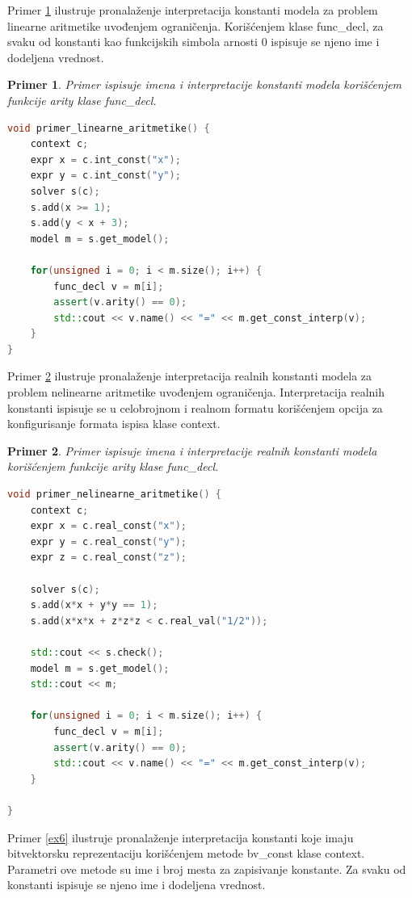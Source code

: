 \documentclass[12pt,oneside]{memoir}
\newtheorem{primer}{Primer}
\begin{document}
Primer \ref{ex4} ilustruje pronalaženje interpretacija konstanti modela za problem linearne aritmetike uvođenjem ograničenja. Korišćenjem klase func\_decl, za svaku od konstanti kao funkcijskih simbola arnosti 0 ispisuje se njeno ime i dodeljena vrednost. 
\begin{primer} \label{ex4}
Primer ispisuje imena i interpretacije konstanti modela korišćenjem funkcije arity klase func\_decl.
\\
\begin{lstlisting}[language=C++]
void primer_linearne_aritmetike() {
    context c;
    expr x = c.int_const("x");
    expr y = c.int_const("y");
    solver s(c);
    s.add(x >= 1);
    s.add(y < x + 3);
    model m = s.get_model();

    for(unsigned i = 0; i < m.size(); i++) {
        func_decl v = m[i];
        assert(v.arity() == 0); 
        std::cout << v.name() << "=" << m.get_const_interp(v);
    }
}
\end{lstlisting}
\end{primer}

Primer \ref{ex5} ilustruje pronalaženje interpretacija realnih konstanti modela za problem nelinearne aritmetike uvođenjem ograničenja. Interpretacija realnih konstanti ispisuje se u celobrojnom i realnom formatu korišćenjem opcija za konfigurisanje formata ispisa klase context. 

\begin{primer} \label{ex5}
Primer ispisuje imena i interpretacije realnih konstanti modela korišćenjem funkcije arity klase func\_decl.
\\
\begin{lstlisting}[language=C++]
void primer_nelinearne_aritmetike() {    
    context c;
    expr x = c.real_const("x");
    expr y = c.real_const("y");
    expr z = c.real_const("z");
                     
    solver s(c);
    s.add(x*x + y*y == 1);                    
    s.add(x*x*x + z*z*z < c.real_val("1/2"));  
    
    std::cout << s.check();
    model m = s.get_model();
    std::cout << m;
    
    for(unsigned i = 0; i < m.size(); i++) {
        func_decl v = m[i];
        assert(v.arity() == 0); 
        std::cout << v.name() << "=" << m.get_const_interp(v);
    }

}
\end{lstlisting}
\end{primer}


Primer \ref{ex6} ilustruje pronalaženje interpretacija konstanti koje imaju bitvektorsku reprezentaciju korišćenjem metode bv\_const klase context. Parametri ove metode su ime i broj mesta za zapisivanje konstante. Za svaku od konstanti ispisuje se njeno ime i dodeljena vrednost.
\end{document}
